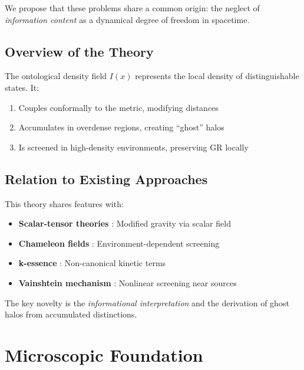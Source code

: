 \documentclass[12pt, a4paper]{article}
\begin{document}
We propose that these problems share a common origin: the neglect of \textit{information content} as a dynamical degree of freedom in spacetime.

\subsection{Overview of the Theory}

The ontological density field $I(x)$ represents the local density of distinguishable states. It:
\begin{enumerate}
    \item Couples conformally to the metric, modifying distances
    \item Accumulates in overdense regions, creating ``ghost'' halos
    \item Is screened in high-density environments, preserving GR locally
\end{enumerate}

\subsection{Relation to Existing Approaches}

This theory shares features with:
\begin{itemize}
    \item \textbf{Scalar-tensor theories} \cite{Horndeski1974}: Modified gravity via scalar field
    \item \textbf{Chameleon fields} \cite{Khoury2004}: Environment-dependent screening
    \item \textbf{k-essence} \cite{ArmendarizPicon2001}: Non-canonical kinetic terms
    \item \textbf{Vainshtein mechanism} \cite{Vainshtein1972}: Nonlinear screening near sources
\end{itemize}

The key novelty is the \textit{informational interpretation} and the derivation of ghost halos from accumulated distinctions.


\section{Microscopic Foundation}
\end{document}
